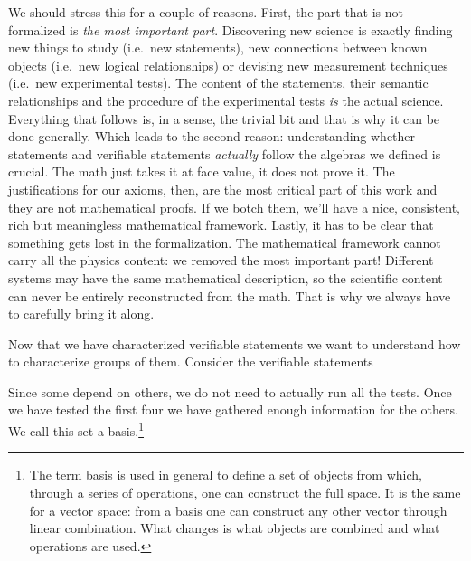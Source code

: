 	We should stress this for a couple of reasons. First, the part that is not formalized is \emph{the most important part}. Discovering new science is exactly finding new things to study (i.e.~new statements), new connections between known objects (i.e.~new logical relationships) or devising new measurement techniques (i.e.~new experimental tests). The content of the statements, their semantic relationships and the procedure of the experimental tests \emph{is} the actual science. Everything that follows is, in a sense, the trivial bit and that is why it can be done generally. Which leads to the second reason: understanding whether statements and verifiable statements \emph{actually} follow the algebras we defined is crucial. The math just takes it at face value, it does not prove it. The justifications for our axioms, then, are the most critical part of this work and they are not mathematical proofs. If we botch them, we'll have a nice, consistent, rich but meaningless mathematical framework. Lastly, it has to be clear that something gets lost in the formalization. The mathematical framework cannot carry all the physics content: we removed the most important part! Different systems may have the same mathematical description, so the scientific content can never be entirely reconstructed from the math. That is why we always have to carefully bring it along.
	
	Now that we have characterized verifiable statements we want to understand how to characterize groups of them. Consider the verifiable statements
	\begin{description}
		\item {}
		\item {}
		\item {}
		\item {}
		\item {}
		\item {}
		\item {}
	\end{description}
	Since some depend on others, we do not need to actually run all the tests. Once we have tested the first four we have gathered enough information for the others. We call this set a basis.\footnote{The term basis is used in general to define a set of objects from which, through a series of operations, one can construct the full space. It is the same for a vector space: from a basis one can construct any other vector through linear combination. What changes is what objects are combined and what operations are used.}
	
